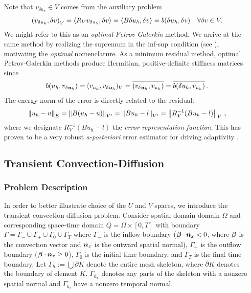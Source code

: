 \documentclass{article}
\theoremstyle{definition}
\theoremstyle{remark}
\begin{document}
Note that $v_{\delta u_h}\in V$ comes from the auxiliary problem
\begin{equation*}
\left( v_{\delta u_h},\delta v \right)_V=\left\langle R_Vv_{\delta u_h},\delta v \right\rangle
=\left\langle B\delta u_h,\delta v \right\rangle=b(\delta u_h,\delta v)\quad\forall\delta v\in V.
\end{equation*}
We might refer to this as an \emph{optimal Petrov-Galerkin} method.
We arrive at the same method by realizing the supremum in the inf-sup condition (see \cite{DPGOverview}), motivating the \emph{optimal} nomenclature.
As a minimum residual method, optimal Petrov-Galerkin methods produce Hermitian, positive-definite stiffness matrices since
\[
b(u_h,v_{\delta\boldsymbol{u}_h})=(v_{u_h},v_{\delta\boldsymbol{u}_h})_V=\overline{(v_{\delta\boldsymbol{u}_h},v_{u_h})}=\overline{b(\delta u_h,v_{u_h})}\,.
\]
The energy norm of the error is directly related to the residual:
\[
\left\| u_h-u \right\|_E=\left\| B(u_h-u) \right\|_{V'}=\left\| Bu_h-l \right\|_{V'}=\left\| R_V^{-1}(Bu_h-l) \right\|_V\,,
\]
where we designate $R_V^{-1}(Bu_h-l)$ the \emph{error representation function}.
This has proven to be a very robust \emph{a-posteriori} error estimator for driving adaptivity \cite{DPG3}.

\subsection{Transient Convection-Diffusion}
\subsubsection{Problem Description}
In order to better illustrate choice of the $U$ and $V$ spaces, we introduce the transient convection-diffusion problem.
Consider spatial domain domain $\Omega$ and corresponding space-time domain $Q=\Omega\times[0,T]$ 
with boundary $\Gamma=\Gamma_-\cup\Gamma_+\cup\Gamma_0\cup\Gamma_T$ 
where $\Gamma_-$ is the inflow boundary ($\boldsymbol\beta\cdot\boldsymbol n_x<0$, where $\boldsymbol\beta$ is the convection vector and $\boldsymbol n_x$ is the outward spatial normal),
$\Gamma_+$ is the outflow boundary ($\boldsymbol\beta\cdot\boldsymbol n_x\geq0$), $\Gamma_0$ is the initial time boundary, 
and $\Gamma_T$ is the final time boundary. Let $\Gamma_h:=\bigcup\partial K$ denote the entire mesh skeleton, 
where $\partial K$ denotes the boundary of element $K$.
$\Gamma_{h_x}$ denotes any parts of the skeleton with a nonzero spatial normal and $\Gamma_{h_t}$ have a nonzero temporal normal.
\end{document}
